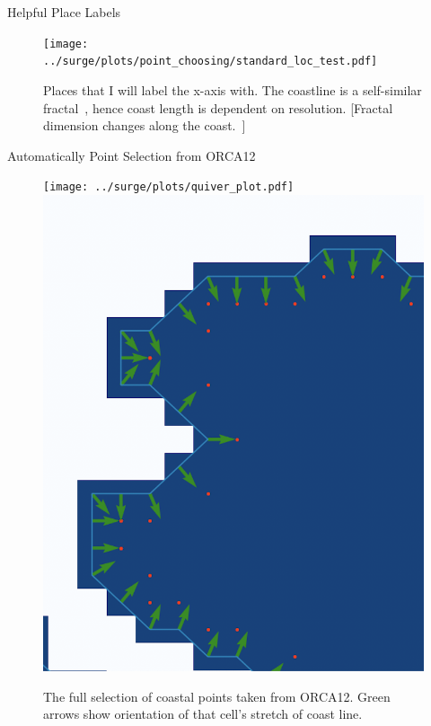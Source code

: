 \documentclass[usenames, dvipsnames]{beamer}
\begin{document}
\begin{frame}{Helpful Place Labels}
\vspace{-20pt}
\begin{figure}[htb!]
    \centering
    \texttt{[image: ../surge/plots/point\_choosing/standard\_loc\_test.pdf]}
    \vspace{-7pt}
    \caption{Places that I will label the x-axis with.
     The coastline is a self-similar fractal~\cite{mandelbrot1967long, richardson1961problem},
      hence coast length is dependent on resolution.
    [Fractal dimension changes along the coast.~\cite{jiang1998fractal}]}
    \label{fig:}
\end{figure}
\end{frame}


\begin{frame}{Automatically Point Selection from ORCA12}
\vspace{-20pt}
\begin{figure}[htb!]
    \centering
    \hspace{-10pt}
    \texttt{[image: ../surge/plots/quiver\_plot.pdf]}
    \hspace{5pt}
    \includegraphics[width=0.38\linewidth]{images/example-images/new-orleans-example.png}
    \vspace{-7pt}
    \caption{The full selection of coastal points taken from ORCA12. Green arrows show
             orientation of that cell's stretch of coast line.}
\end{figure}
\end{frame}
\end{document}
